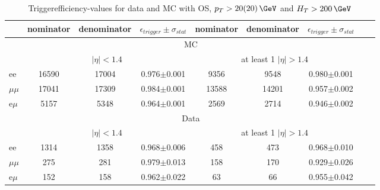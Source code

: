 
\begin{table}[hbp] \caption{Triggerefficiency-values for data and MC with OS, $p_T>20(20)\,\GeV$ and $H_T>200\,\GeV$} 
\centering 
\renewcommand{\arraystretch}{1.2} 
\begin{tabular}{|l|c|c|c|c|c|c|c|c|}     
\hline    
 & nominator & denominator & $\epsilon_{trigger} \pm \sigma_{stat}$ &  nominator & denominator & $\epsilon_{trigger} \pm \sigma_{stat}$  \\    
\hline\hline
& \multicolumn{6}{|c|}{MC} \\
\hline
&  \multicolumn{3}{|c|}{$|\eta|<1.4$ } & \multicolumn{3}{|c|}{ at least 1 $|\eta| > 1.4$ } \\
\hline 
ee & 16590 & 17004 & 0.976$\pm$0.001 & 9356 & 9548 & 0.980$\pm$0.001 \\
$\mu\mu$ & 17041 & 17309 & 0.984$\pm$0.001 & 13588 & 14201 & 0.957$\pm$0.002 \\
e$\mu$ & 5157 & 5348 & 0.964$\pm$0.001 & 2569 & 2714 & 0.946$\pm$0.002 \\
    
    \hline 
&\multicolumn{6}{|c|}{Data} \\
\hline
&  \multicolumn{3}{|c|}{$|\eta|<1.4$ } & \multicolumn{3}{|c|}{ at least 1 $|\eta| > 1.4$ }\\
\hline
ee & 1314 & 1358 & 0.968$\pm$0.006 & 458 & 473 & 0.968$\pm$0.010 \\
$\mu\mu$ & 275 & 281 & 0.979$\pm$0.013 & 158 & 170 & 0.929$\pm$0.026 \\
e$\mu$ & 152 & 158 & 0.962$\pm$0.022 & 63 & 66 & 0.955$\pm$0.042 \\
 
 \hline     
\end{tabular}  
\label{tab:EffValues}
\end{table}
